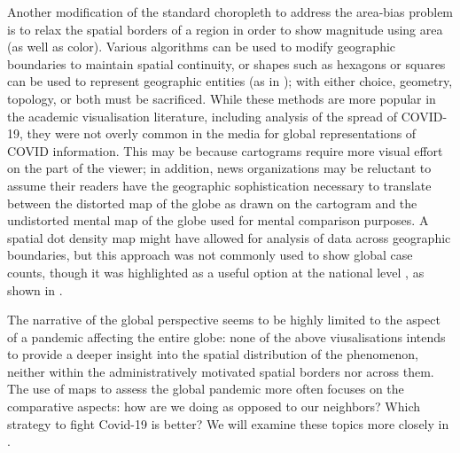 \documentclass[article]{jdssv}\usepackage[]{graphicx}\usepackage[]{xcolor}
\begin{document}
Another modification of the standard choropleth to address the area-bias problem is to relax the spatial borders of a region in order to show magnitude using area (as well as color). Various algorithms can be used to modify geographic boundaries to maintain spatial continuity, or shapes such as hexagons or squares can be used to represent geographic entities (as in ); with either choice, geometry, topology, or both must be sacrificed.  While these methods are more popular in the academic visualisation literature, including analysis of the spread of COVID-19\citep{yalcinMappingGlobalSpatiotemporal2022}, they were not overly common in the media for global representations of COVID information. This may be because cartograms require more visual effort on the part of the viewer; in addition, news organizations may be reluctant to assume their readers have the geographic sophistication necessary to translate between the distorted map of the globe as drawn on the cartogram and the undistorted mental map of the globe used for mental comparison purposes. 
A spatial dot density map might have allowed for analysis of data across geographic boundaries, but this approach was not commonly used to show global case counts, though it was highlighted as a useful option at the national level \citep{fieldMappingCoronavirusResponsibly}, as shown in .

The narrative of the global perspective seems to be highly limited to the aspect of a pandemic affecting the entire globe: none of the above viusalisations intends to provide a deeper insight into the spatial distribution of the phenomenon, neither within the administratively motivated spatial borders nor across them. 
The use of maps to assess the global pandemic more often focuses on the comparative aspects: how are we doing as opposed to our neighbors? Which strategy to fight Covid-19 is better? 
We will examine these topics more closely in .
\end{document}
